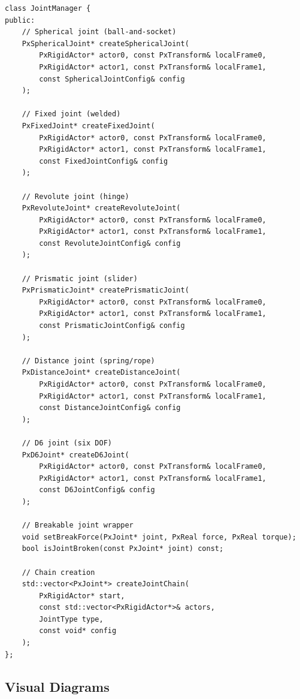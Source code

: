 \begin{lstlisting}[caption={JointManager API}]
class JointManager {
public:
    // Spherical joint (ball-and-socket)
    PxSphericalJoint* createSphericalJoint(
        PxRigidActor* actor0, const PxTransform& localFrame0,
        PxRigidActor* actor1, const PxTransform& localFrame1,
        const SphericalJointConfig& config
    );

    // Fixed joint (welded)
    PxFixedJoint* createFixedJoint(
        PxRigidActor* actor0, const PxTransform& localFrame0,
        PxRigidActor* actor1, const PxTransform& localFrame1,
        const FixedJointConfig& config
    );

    // Revolute joint (hinge)
    PxRevoluteJoint* createRevoluteJoint(
        PxRigidActor* actor0, const PxTransform& localFrame0,
        PxRigidActor* actor1, const PxTransform& localFrame1,
        const RevoluteJointConfig& config
    );

    // Prismatic joint (slider)
    PxPrismaticJoint* createPrismaticJoint(
        PxRigidActor* actor0, const PxTransform& localFrame0,
        PxRigidActor* actor1, const PxTransform& localFrame1,
        const PrismaticJointConfig& config
    );

    // Distance joint (spring/rope)
    PxDistanceJoint* createDistanceJoint(
        PxRigidActor* actor0, const PxTransform& localFrame0,
        PxRigidActor* actor1, const PxTransform& localFrame1,
        const DistanceJointConfig& config
    );

    // D6 joint (six DOF)
    PxD6Joint* createD6Joint(
        PxRigidActor* actor0, const PxTransform& localFrame0,
        PxRigidActor* actor1, const PxTransform& localFrame1,
        const D6JointConfig& config
    );

    // Breakable joint wrapper
    void setBreakForce(PxJoint* joint, PxReal force, PxReal torque);
    bool isJointBroken(const PxJoint* joint) const;

    // Chain creation
    std::vector<PxJoint*> createJointChain(
        PxRigidActor* start,
        const std::vector<PxRigidActor*>& actors,
        JointType type,
        const void* config
    );
};
\end{lstlisting}


\subsection{Visual Diagrams}

